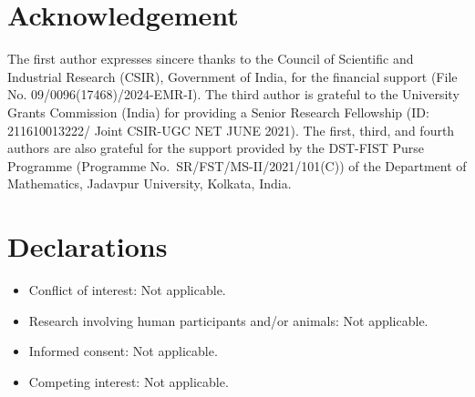 \documentclass[11pt,leqno]{amsart}
\theoremstyle{definition}
\numberwithin{equation}{section}
\begin{document}
\section*{Acknowledgement}
The first author expresses sincere thanks to the Council of Scientific and Industrial Research (CSIR), Government of India, for the financial support (File No. 09/0096(17468)/2024-EMR-I). The third author is grateful to the University Grants Commission (India) for providing a Senior Research Fellowship (ID:
211610013222/ Joint CSIR-UGC NET JUNE 2021). The first, third, and fourth authors are also grateful for the support provided by the DST-FIST Purse Programme (Programme No.~SR/FST/MS-II/2021/101(C)) of the Department of Mathematics, Jadavpur University, Kolkata, India.

\section*{Declarations}
\begin{itemize}
	\item Conflict of interest: Not applicable.
	
	\item Research involving human participants and/or animals: Not applicable.
	
	\item Informed consent: Not applicable.
	
	\item Competing interest: Not applicable.
\end{itemize}
\end{document}
